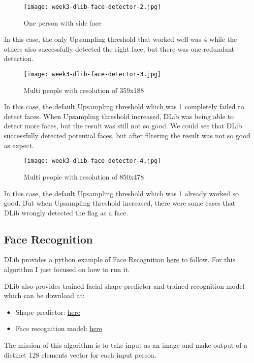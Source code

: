 \newpage
\begin{SCfigure}[0.5][!ht]
\caption{One person with side face}
\texttt{[image: week3-dlib-face-detector-2.jpg]}
\end{SCfigure}
In this case, the only Upsampling threshold that worked well was 4 while the others also successfully detected the right face, but there was one redundant detection.

\newpage
\begin{figure}[!ht]
\centering
\texttt{[image: week3-dlib-face-detector-3.jpg]}
\caption{Multi people with resolution of 359x188}
\end{figure}
In this case, the default Upsampling threshold which was 1 completely failed to detect faces. When Upsampling threshold increased, DLib was being able to detect more faces, but the result was still not so good. We could see that DLib successfully detected potential faces, but after filtering the result was not so good as expect.

\newpage
\begin{figure}[!ht]
\centering
\texttt{[image: week3-dlib-face-detector-4.jpg]}
\caption{Multi people with resolution of 850x478}
\end{figure}
In this case, the default Upsampling threshold which was 1 already worked so good. But when Upsampling threshold increased, there were some cases that DLib wrongly detected the flag as a face.

\newpage
\subsection{Face Recognition}
DLib provides a python example of Face Recognition \href{http://dlib.net/face_recognition.py.html}{here} to follow. For this algorithm I just focused on how to run it.

DLib also provides trained facial shape predictor and trained recognition model which can be download at:
\begin{itemize}
\item Shape predictor: \href{http://dlib.net/files/shape_predictor_5_face_landmarks.dat.bz2}{here}
\item Face recognition model: \href{http://dlib.net/files/dlib_face_recognition_resnet_model_v1.dat.bz2}{here}
\end{itemize}

The mission of this algorithm is to take input as an image and make output of a distinct 128 elements vector for each input person.

